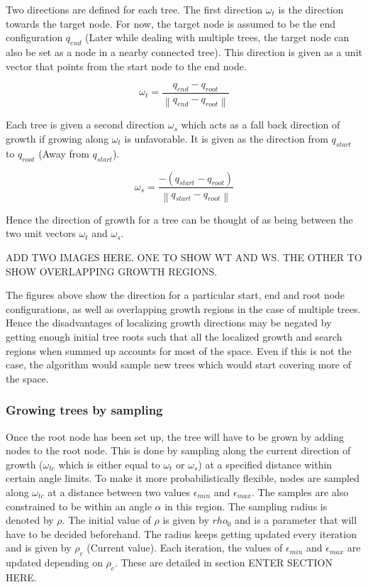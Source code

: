 \documentclass[fleqn]{article}
\newcommand{\norm}[1]{\left\lVert #1 \right\rVert}
\begin{document}
	Two directions are defined for each tree. The first direction $\omega_t$ is the direction towards the target node. For now, the target node is assumed to be the end configuration $q_{end}$ (Later while dealing with multiple trees, the target node can also be set as a node in a nearby connected tree). This direction is given as a unit vector that points from the start node to the end node.
	
	\[\omega_t = \frac{q_{end} - q_{root}}{\norm{q_{end} - q_{root}}}\]
	
	Each tree is given a second direction $\omega_s$ which acts as a fall back direction of growth if growing along $\omega_t$ is unfavorable. It is given as the direction from $q_{start}$ to $q_{root}$ (Away from $q_{start}$).
	
	\[\omega_s = \frac{-(q_{start} - q_{root})}{\norm{q_{start} - q_{root}}}\]
		
	Hence the direction of growth for a tree can be thought of as being between the two unit vectors $\omega_t$ and $\omega_s$.
	
	ADD TWO IMAGES HERE. ONE TO SHOW WT AND WS. THE OTHER TO SHOW OVERLAPPING GROWTH REGIONS.
	
	The figures above show the direction for a particular start, end and root node configurations, as well as overlapping growth regions in the case of multiple trees. Hence the disadvantages of localizing growth directions may be negated by getting enough initial tree roots such that all the localized growth and search regions when summed up accounts for most of the space. Even if this is not the case, the algorithm would sample new trees which would start covering more of the space.
	
	\subsubsection{Growing trees by sampling}
	
	Once the root node has been set up, the tree will have to be grown by adding nodes to the root node. This is done by sampling along the current direction of growth ($\omega_{tc}$ which is either equal to $\omega_t$ or $\omega_s$) at a specified distance within certain angle limits. To make it more probabilistically flexible, nodes are sampled along $\omega_{tc}$ at a distance between two values $\epsilon_{min}$ and $\epsilon_{max}$. The samples are also constrained to be within an angle $\alpha$ in this region. The sampling radius is denoted by $\rho$. The initial value of $\rho$ is given by $rho_0$ and is a parameter that will have to be decided beforehand. The radius keeps getting updated every iteration and is given by $\rho_c$ (Current value). Each iteration, the values of $\epsilon_{min}$ and $\epsilon_{max}$ are updated depending on $\rho_c$. These are detailed in section ENTER SECTION HERE.
	
\end{document}
